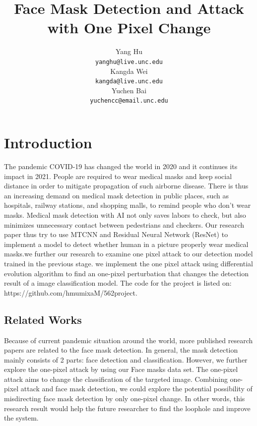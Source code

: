 \documentclass{article}
\title{Face Mask Detection and Attack with One Pixel Change}
\author{ Yang Hu \\
	\texttt{yanghu@live.unc.edu} \\
	\And
	Kangda Wei \\
	\texttt{kangda@live.unc.edu} \\
	\And
	Yuchen Bai \\
	\texttt{yuchencc@email.unc.edu} \\
}
\begin{document}
\maketitle


\section{Introduction}
The pandemic COVID-19 has changed the world in 2020 and it continues its impact in 2021. People are required to wear medical masks and keep social distance in order to mitigate propagation of such airborne disease. There is thus an increasing demand on medical mask detection in public places, such as hospitals, railway stations, and shopping malls, to remind people who don't wear masks. Medical mask detection with AI not only saves labors to check, but also minimizes unnecessary contact between pedestrians and checkers. Our research paper thus try to use MTCNN and Residual Neural Network (ResNet) to implement a model to detect whether human in a picture properly wear medical masks.we further our research to examine one pixel attack to our detection model trained in the previous stage. we implement the one pixel attack using differential evolution algorithm to find an one-pixel perturbation that changes the detection result of a image classification model. The code for the project is listed on: https://github.com/hmumixaM/562project.

\subsection{Related Works}
Because of current pandemic situation around the world, more published research papers are related to the face mask detection. In general, the mask detection mainly consists of 2 parts: face detection and classification. However, we further explore the one-pixel attack by using our Face masks data set. The one-pixel attack aims to change the classification of the targeted image. Combining one-pixel attack and face mask detection, we could explore the potential possibility of misdirecting face mask detection by only one-pixel change. In other words, this research result would help the future researcher to find the loophole and improve the system.
\end{document}
